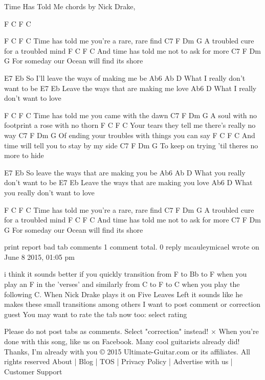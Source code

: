 

Time Has Told Me chords by Nick Drake, 


F        C       F       C

F       C                 F                 C
  Time     has told me        you're a rare, rare find 
C7             F        Dm               G
   A troubled cure         for a troubled mind
F            C              F             C
    And time    has told me     not to ask for more
C7                   F     Dm                    G
   For someday our Ocean        will find its shore

E7                       Eb
   So I'll leave the ways of making me be
Ab6 Ab                       D
        What I really don't want to be
E7                       Eb
  Leave the ways that are making me love
Ab6                       D
     What I really don't want to love

F       C                 F           C
  Time     has told me       you came with the dawn
C7               F           Dm                  G
   A soul with no footprint      a rose with no thorn
F           C               F                C
  Your tears they tell me      there's really no way
C7               F         Dm                      G
  Of ending your troubles     with things you can say
F         C                F              C
  And time will tell you      to stay by my side
C7              F         Dm                 G
   To keep on trying         'til theres no more to hide

E7                        Eb
  So leave the ways that are making you be
Ab6  Ab                        D
        What you really don't want to be
E7                       Eb
  Leave the ways that are making you love
Ab6                        D
    What you really don't want to love

F       C                 F                 C
  Time     has told me        you're a rare, rare find 
C7             F        Dm               G
   A troubled cure         for a troubled mind
F            C              F             C
    And time    has told me     not to ask for more
C7                   F     Dm                    G
   For someday our Ocean        will find its shore

print
report bad tab
comments
1 comment total.
0
reply
mcauleymicael wrote on June 8 2015, 01:05 pm

i think it sounds better if you quickly transition from F to Bb to F when you play an F in the 'verses' and similarly from C to F to C when you play the following C. When Nick Drake plays it on Five Leaves Left it sounds like he makes these small transitions among others
I want to post comment or correction
guest
You may want to rate the tab now too:
select rating
	
Please do not post tabs as comments. Select "correction" instead!
×
When you're done with this song, like us on Facebook. Many cool guitarists already did!
Thanks, I'm already with you
© 2015 Ultimate-Guitar.com or its affiliates. All rights reserved     About | Blog | TOS | Privacy Policy | Advertise with us | Customer Support

